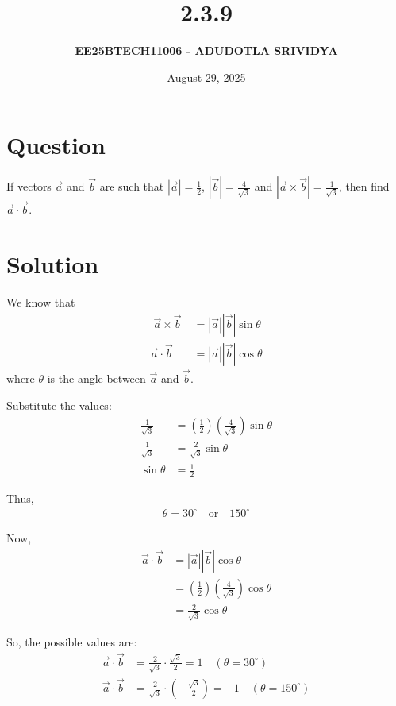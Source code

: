 \documentclass[journal]{IEEEtran}
\title{\textbf{2.3.9}}
\author{\textbf{EE25BTECH11006 - ADUDOTLA SRIVIDYA}}
\date{August 29, 2025}
\begin{document}
\maketitle

\section*{\textbf{Question}}
If vectors $\vec{a}$ and $\vec{b}$ are such that $|\vec{a}| = \frac{1}{2}$, $|\vec{b}| = \frac{4}{\sqrt{3}}$ and $|\vec{a} \times \vec{b}| = \frac{1}{\sqrt{3}}$, then find $\vec{a} \cdot \vec{b}$.

\section*{\textbf{Solution}}
We know that
\begin{align}
|\vec{a} \times \vec{b}| &= |\vec{a}||\vec{b}|\sin\theta \\
\vec{a} \cdot \vec{b} &= |\vec{a}||\vec{b}|\cos\theta
\end{align}
where $\theta$ is the angle between $\vec{a}$ and $\vec{b}$.

\noindent
Substitute the values:
\begin{align}
\frac{1}{\sqrt{3}} &= \left(\frac{1}{2}\right)\left(\frac{4}{\sqrt{3}}\right)\sin\theta \\
\frac{1}{\sqrt{3}} &= \frac{2}{\sqrt{3}} \sin\theta \\
\sin\theta &= \frac{1}{2}
\end{align}

Thus,
\begin{align}
\theta = 30^\circ \quad \text{or} \quad 150^\circ
\end{align}

\noindent
Now,
\begin{align}
\vec{a} \cdot \vec{b} &= |\vec{a}||\vec{b}|\cos\theta \\
&= \left(\frac{1}{2}\right)\left(\frac{4}{\sqrt{3}}\right)\cos\theta \\
&= \frac{2}{\sqrt{3}}\cos\theta
\end{align}

\noindent
So, the possible values are:
\begin{align}
\vec{a} \cdot \vec{b} &= \frac{2}{\sqrt{3}} \cdot \frac{\sqrt{3}}{2} = 1 \quad (\theta = 30^\circ) \\
\vec{a} \cdot \vec{b} &= \frac{2}{\sqrt{3}} \cdot \left(-\frac{\sqrt{3}}{2}\right) = -1 \quad (\theta = 150^\circ)
\end{align}
\end{document}
